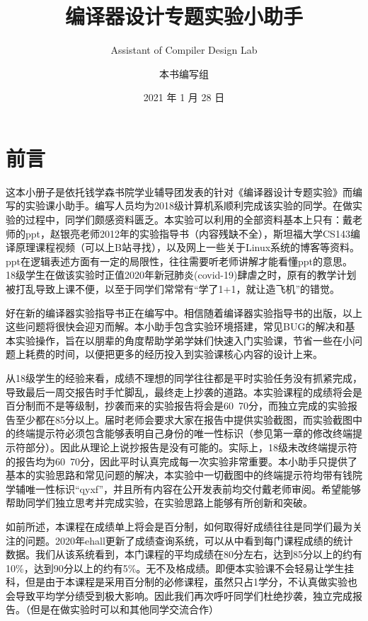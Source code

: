 \documentclass[
  10pt,
  twoside,
  openany,
  b5paper, %
  colorscheme = basic, %
]{qyxf-book}
\title{编译器设计专题实验小助手}
\subtitle{Assistant of Compiler Design Lab}  %
\author{本书编写组}
\date{2021 年 1 月 28 日}
\begin{document}
\maketitle

\chapter*{前言}
\thispagestyle{empty}

这本小册子是依托钱学森书院学业辅导团发表的针对《编译器设计专题实验》而编写的实验课小助手。编写人员均为2018级计算机系顺利完成该实验的同学。在做实验的过程中，同学们颇感资料匮乏。本实验可以利用的全部资料基本上只有：戴老师的ppt，赵银亮老师2012年的实验指导书（内容残缺不全），斯坦福大学CS143编译原理课程视频（可以上B站寻找），以及网上一些关于Linux系统的博客等资料。ppt在逻辑表述方面有一定的局限性，往往需要听老师讲解才能看懂ppt的意思。18级学生在做该实验时正值2020年新冠肺炎(covid-19)肆虐之时，原有的教学计划被打乱导致上课不便，以至于同学们常常有“学了1+1，就让造飞机”的错觉。

好在新的编译器实验指导书正在编写中。相信随着编译器实验指导书的出版，以上这些问题将很快会迎刃而解。本小助手包含实验环境搭建，常见BUG的解决和基本实验操作，旨在以朋辈的角度帮助学弟学妹们快速入门实验课，节省一些在小问题上耗费的时间，以便把更多的经历投入到实验课核心内容的设计上来。

从18级学生的经验来看，成绩不理想的同学往往都是平时实验任务没有抓紧完成，导致最后一周交报告时手忙脚乱，最终走上抄袭的道路。本实验课程的成绩将会是百分制而不是等级制，抄袭而来的实验报告将会是60~70分，而独立完成的实验报告至少都在85分以上。届时老师会要求大家在报告中提供实验截图，而实验截图中的终端提示符必须包含能够表明自己身份的唯一性标识（参见第一章的修改终端提示符部分）。因此从理论上说抄报告是没有可能的。实际上，18级未改终端提示符的报告均为60~70分，因此平时认真完成每一次实验非常重要。本小助手只提供了基本的实验思路和常见问题的解决，本实验中一切截图中的终端提示符均带有钱院学辅唯一性标识“qyxf”，并且所有内容在公开发表前均交付戴老师审阅。希望能够帮助同学们独立思考并完成实验，在实验思路上能够有所创新和突破。

如前所述，本课程在成绩单上将会是百分制，如何取得好成绩往往是同学们最为关注的问题。2020年ehall更新了成绩查询系统，可以从中看到每门课程成绩的统计数据。我们从该系统看到，本门课程的平均成绩在80分左右，达到85分以上的约有10\%，达到90分以上的约有5\%。无不及格成绩。即便本实验课不会轻易让学生挂科，但是由于本课程是采用百分制的必修课程，虽然只占1学分，不认真做实验也会导致平均学分绩受到极大影响。因此我们再次呼吁同学们杜绝抄袭，独立完成报告。（但是在做实验时可以和其他同学交流合作）
\end{document}
